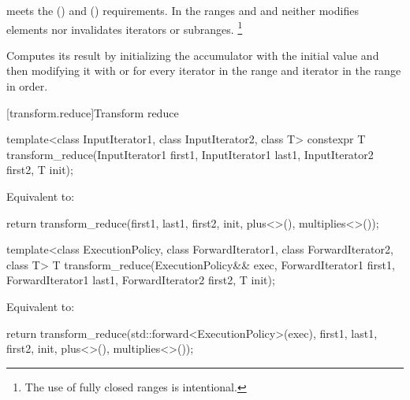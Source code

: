 \begin{itemdescr}
\pnum
\expects
{} meets
the  ()
and  () requirements.
In the ranges  and
 and 
neither modifies elements nor invalidates iterators or subranges.%
\footnote{The use of fully closed ranges is intentional.}

\pnum
\effects
Computes its result by
initializing the accumulator  with the initial value 
and then modifying it with
 or
for every iterator  in the range 
and iterator  in the range 
in order.
\end{itemdescr}

[transform.reduce]{Transform reduce}
%
\begin{itemdecl}
template<class InputIterator1, class InputIterator2, class T>
  constexpr T transform_reduce(InputIterator1 first1, InputIterator1 last1,
                               InputIterator2 first2,
                               T init);
\end{itemdecl}

\begin{itemdescr}
\pnum
\effects
Equivalent to:
\begin{codeblock}
return transform_reduce(first1, last1, first2, init, plus<>(), multiplies<>());
\end{codeblock}
\end{itemdescr}

%
\begin{itemdecl}
template<class ExecutionPolicy,
         class ForwardIterator1, class ForwardIterator2, class T>
  T transform_reduce(ExecutionPolicy&& exec,
                     ForwardIterator1 first1, ForwardIterator1 last1,
                     ForwardIterator2 first2,
                     T init);
\end{itemdecl}

\begin{itemdescr}
\pnum
\effects
Equivalent to:
\begin{codeblock}
return transform_reduce(std::forward<ExecutionPolicy>(exec),
                        first1, last1, first2, init, plus<>(), multiplies<>());
\end{codeblock}
\end{itemdescr}

